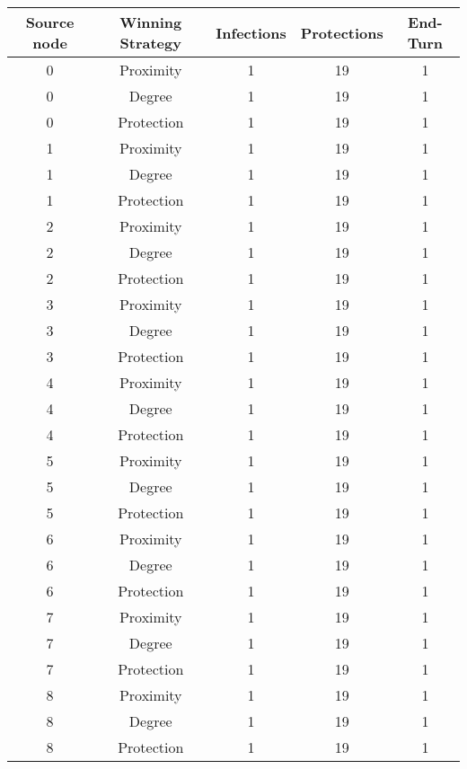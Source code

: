 \documentclass[results.tex]{subfiles}
\begin{document}
\begin{center}
  \begin{tabular}{| c || c | c | c | c |}
    \hline
    {\bfseries Source node} & {\bfseries Winning Strategy} & {\bfseries Infections} & {\bfseries Protections} & {\bfseries End-Turn} \\  %
    \hline\hline
    0 & Proximity & 1 & 19 & 1 \\
    \hline
    0 & Degree & 1 & 19 & 1 \\
    \hline
    0 & Protection & 1 & 19 & 1 \\
    \hline
    1 & Proximity & 1 & 19 & 1 \\
    \hline
    1 & Degree & 1 & 19 & 1 \\
    \hline
    1 & Protection & 1 & 19 & 1 \\
    \hline
    2 & Proximity & 1 & 19 & 1 \\
    \hline
    2 & Degree & 1 & 19 & 1 \\
    \hline
    2 & Protection & 1 & 19 & 1 \\
    \hline
    3 & Proximity & 1 & 19 & 1 \\
    \hline
    3 & Degree & 1 & 19 & 1 \\
    \hline
    3 & Protection & 1 & 19 & 1 \\
    \hline
    4 & Proximity & 1 & 19 & 1 \\
    \hline
    4 & Degree & 1 & 19 & 1 \\
    \hline
    4 & Protection & 1 & 19 & 1 \\
    \hline
    5 & Proximity & 1 & 19 & 1 \\
    \hline
    5 & Degree & 1 & 19 & 1 \\
    \hline
    5 & Protection & 1 & 19 & 1 \\
    \hline
    6 & Proximity & 1 & 19 & 1 \\
    \hline
    6 & Degree & 1 & 19 & 1 \\
    \hline
    6 & Protection & 1 & 19 & 1 \\
    \hline
    7 & Proximity & 1 & 19 & 1 \\
    \hline
    7 & Degree & 1 & 19 & 1 \\
    \hline
    7 & Protection & 1 & 19 & 1 \\
    \hline
    8 & Proximity & 1 & 19 & 1 \\
    \hline
    8 & Degree & 1 & 19 & 1 \\
    \hline
    8 & Protection & 1 & 19 & 1 \\

\end{tabular}
\end{center}
\end{document}
